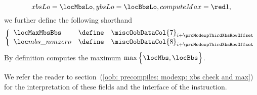 \begin{description}
\begin{description}
\[{						xbsLo      = \locMbsLo ,
						ybsLo      = \locBbsLo ,
						computeMax = \one      ,
						}
				\]
				we further define the following shorthand
				\[
					\left\{ \begin{array}{lcl}
						\locMaxMbsBbs    & \define & \miscOobDataCol{7} _ {i + \prcModexpThirdXbsRowOffset} \\
						\locMbsIsNonzero & \define & \miscOobDataCol{8} _ {i + \prcModexpThirdXbsRowOffset} \\
					\end{array} \right.
				\]
				\saNote{} By definition \locMaxMbsBbs{} computes the maximum $\max \Big \{ \locMbs, \locBbs \Big \} $.
		\end{description}
	\end{description}
	We refer the reader to section~(\ref{oob: precompiles: modexp: xbs check and max}) for the interpretation of these fields and the interface of the \oobInstModexpXbs{} instruction. 

